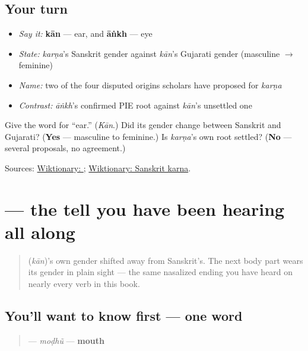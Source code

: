 \subsection*{Your turn}
\begin{itemize}
\raggedright
  \item \emph{Say it:} \textbf{kān} — ear, and \textbf{āṅkh} — eye
  \item \emph{State:} \emph{karṇa}'s Sanskrit gender against \emph{kān}'s Gujarati gender (masculine $\to$ feminine)
  \item \emph{Name:} two of the four disputed origins scholars have proposed for \emph{karṇa}
  \item \emph{Contrast:} \emph{āṅkh}'s confirmed PIE root against \emph{kān}'s unsettled one
\end{itemize}

\begin{tcolorbox}[breakable,colback=teal!4,colframe=teal!35!black,title={Before you move on}]
Give the word for \textquotedblleft{}ear.\textquotedblright{} (\emph{Kān}.) Did its gender change between Sanskrit and Gujarati? (\textbf{Yes} — masculine to feminine.) Is \emph{karṇa}'s own root settled? (\textbf{No} — several proposals, no agreement.)

Sources: \href{https://en.wiktionary.org/wiki/\%E0\%AA\%95\%E0\%AA\%BE\%E0\%AA\%A8}{Wiktionary: }; \href{https://en.wiktionary.org/wiki/\%E0\%A4\%95\%E0\%A4\%B0\%E0\%A5\%8D\%E0\%A4\%A3}{Wiktionary: Sanskrit karna}.
\end{tcolorbox}
\section[moḍhũ]{ — the tell you have been hearing all along}

\label{lesson:GU-C12-modhu}



\begin{quote}
\textbf{} (\emph{kān})'s own gender shifted away from Sanskrit's. The next body part wears its gender in plain sight — the same nasalized ending you have heard on nearly every verb in this book.
\end{quote}

\subsection*{You'll want to know first — one word}
\begin{quote}
\textbf{} — \emph{moḍhũ} — \textbf{mouth}
\end{quote}

